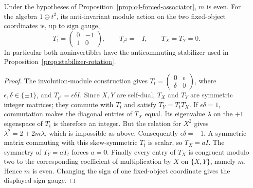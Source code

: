 \begin{lemma}\label{lem:c4-uniform-module}
Under the hypotheses of Proposition~\ref{prop:c4-forced-associator},
$m$ is even. For the algebra $1\oplus t^2$, its anti-invariant
module action on the two fixed-object coordinates is, up to sign gauge,
\[
 T_t=\begin{pmatrix}0&-1\\1&0\end{pmatrix},\qquad
 T_{t^2}=-I,\qquad T_X=T_Y=0.
\]
In particular both noninvertibles have the anticommuting stabilizer
used in Proposition~\ref{prop:stabilizer-rotation}.
\end{lemma}
\begin{proof}
The involution-module construction gives
$T_t=\left(\begin{smallmatrix}0&\epsilon\\\delta&0\end{smallmatrix}\right)$,
where $\epsilon,\delta\in\{\pm1\}$, and
$T_{t^2}=\epsilon\delta I$. Since $X,Y$ are self-dual,
$T_X$ and $T_Y$ are symmetric integer matrices; they commute with
$T_t$ and satisfy $T_Y=T_tT_X$.
If $\epsilon\delta=1$, commutation makes the diagonal entries
of $T_X$ equal. Its eigenvalue $\lambda$ on the $+1$ eigenspace
of $T_t$ is therefore an integer. But the relation for $X^2$
gives $\lambda^2=2+2m\lambda$, which is impossible as above.
Consequently $\epsilon\delta=-1$. A symmetric matrix commuting
with this skew-symmetric $T_t$ is scalar, so $T_X=aI$.
The symmetry of $T_Y=aT_t$ forces $a=0$. Finally every entry
of $T_X$ is congruent modulo two to the corresponding coefficient
of multiplication by $X$ on $\{X,Y\}$, namely $m$. Hence $m$
is even. Changing the sign of one fixed-object coordinate gives
the displayed sign gauge.
\end{proof}

